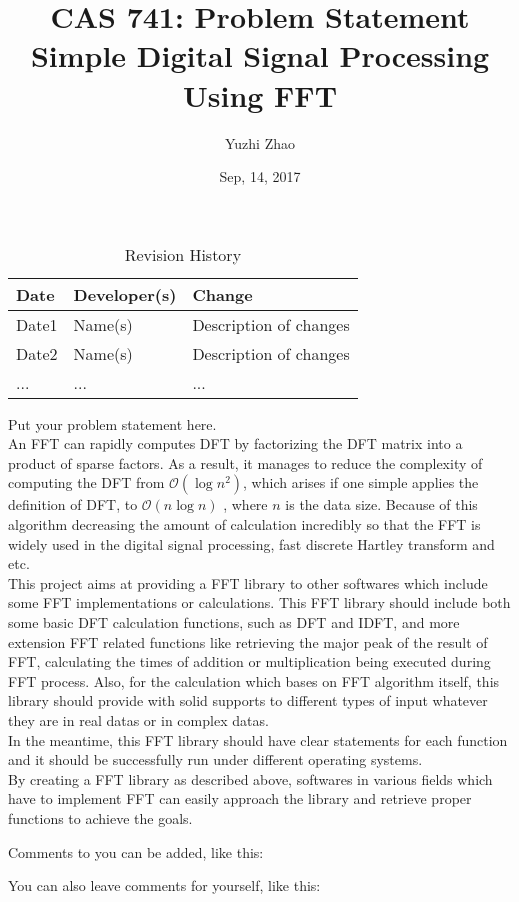 \documentclass{article}
\title{CAS 741: Problem Statement\\Simple Digital Signal Processing Using FFT }
\author{Yuzhi Zhao}
\date{Sep, 14, 2017}
\begin{document}
\maketitle

\begin{table}[hp]
\caption{Revision History} \label{TblRevisionHistory}
\begin{tabularx}{\textwidth}{llX}
\toprule
\textbf{Date} & \textbf{Developer(s)} & \textbf{Change}\\
\midrule
Date1 & Name(s) & Description of changes\\
Date2 & Name(s) & Description of changes\\
... & ... & ...\\
\bottomrule
\end{tabularx}
\end{table}

Put your problem statement here.  \\
An FFT can rapidly computes DFT by factorizing the DFT  matrix into a product of sparse factors. As a result, it manages to reduce the complexity of computing the DFT from 
$\mathcal{O}(\log{}n^2)$, which arises if one simple applies the definition of DFT, to 
$\mathcal{O}(n\log{}n)$ , where $\mathcal{}n$ is the data size. Because of this algorithm decreasing the amount of calculation incredibly so that the FFT is widely used in the digital signal processing, fast discrete Hartley transform and etc.\\

This project aims at providing a FFT library to other softwares which include some FFT implementations or calculations. This FFT library should include both some basic DFT calculation functions, such as DFT and IDFT, and more extension FFT related functions like retrieving the major peak of the result of FFT, calculating the times of addition or multiplication being executed during FFT process. Also, for the  calculation which bases on FFT algorithm itself, this library should provide with solid supports to different types of input whatever they are in real datas or in complex datas.\\

In the meantime, this FFT library should have clear statements for each function and it should be successfully run under different operating systems.\\

By creating a FFT library as described above, softwares in various fields which have to implement FFT can easily approach the library and retrieve proper functions to achieve the goals.



Comments to you can be added, like this:


You can also leave comments for yourself, like this:

\end{document}
